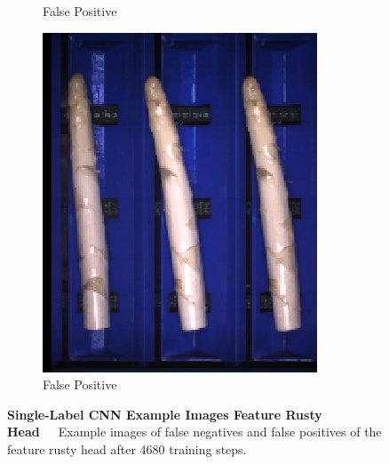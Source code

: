 \begin{figure}[h]
\begin{subfigure}{0.3\textwidth}
		\vspace{-5pt}
		\caption{False Positive}
	\end{subfigure}
	\begin{subfigure}{0.3\textwidth}
		\includegraphics[width=0.9\linewidth]{Figures/appendix/rustyhead_falsepositive_03.png}
		\vspace{-5pt}
		\caption{False Positive}
	\end{subfigure}
	\vspace{-5pt}
	\caption[Single-Label CNN Example Images Feature Rusty Head]{\textbf{Single-Label CNN Example Images Feature Rusty Head}~~~Example images of false negatives and false positives of the feature rusty head after 4680 training steps.}
	\vspace{-20pt}
    \label{fig:ExampleImagesRustyHead}
\end{figure}

